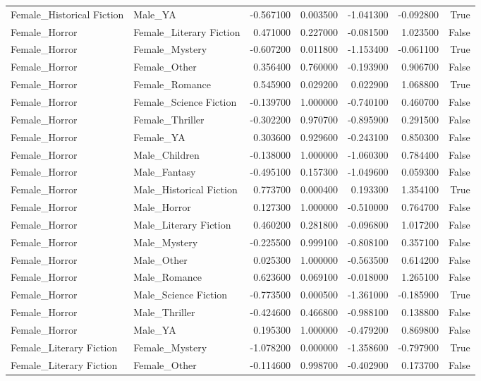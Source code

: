 \begin{tabular}{llrrrrr}
Female_Historical Fiction & Male_YA & -0.567100 & 0.003500 & -1.041300 & -0.092800 & True \\
Female_Horror & Female_Literary Fiction & 0.471000 & 0.227000 & -0.081500 & 1.023500 & False \\
Female_Horror & Female_Mystery & -0.607200 & 0.011800 & -1.153400 & -0.061100 & True \\
Female_Horror & Female_Other & 0.356400 & 0.760000 & -0.193900 & 0.906700 & False \\
Female_Horror & Female_Romance & 0.545900 & 0.029200 & 0.022900 & 1.068800 & True \\
Female_Horror & Female_Science Fiction & -0.139700 & 1.000000 & -0.740100 & 0.460700 & False \\
Female_Horror & Female_Thriller & -0.302200 & 0.970700 & -0.895900 & 0.291500 & False \\
Female_Horror & Female_YA & 0.303600 & 0.929600 & -0.243100 & 0.850300 & False \\
Female_Horror & Male_Children & -0.138000 & 1.000000 & -1.060300 & 0.784400 & False \\
Female_Horror & Male_Fantasy & -0.495100 & 0.157300 & -1.049600 & 0.059300 & False \\
Female_Horror & Male_Historical Fiction & 0.773700 & 0.000400 & 0.193300 & 1.354100 & True \\
Female_Horror & Male_Horror & 0.127300 & 1.000000 & -0.510000 & 0.764700 & False \\
Female_Horror & Male_Literary Fiction & 0.460200 & 0.281800 & -0.096800 & 1.017200 & False \\
Female_Horror & Male_Mystery & -0.225500 & 0.999100 & -0.808100 & 0.357100 & False \\
Female_Horror & Male_Other & 0.025300 & 1.000000 & -0.563500 & 0.614200 & False \\
Female_Horror & Male_Romance & 0.623600 & 0.069100 & -0.018000 & 1.265100 & False \\
Female_Horror & Male_Science Fiction & -0.773500 & 0.000500 & -1.361000 & -0.185900 & True \\
Female_Horror & Male_Thriller & -0.424600 & 0.466800 & -0.988100 & 0.138800 & False \\
Female_Horror & Male_YA & 0.195300 & 1.000000 & -0.479200 & 0.869800 & False \\
Female_Literary Fiction & Female_Mystery & -1.078200 & 0.000000 & -1.358600 & -0.797900 & True \\
Female_Literary Fiction & Female_Other & -0.114600 & 0.998700 & -0.402900 & 0.173700 & False \\

\end{tabular}
